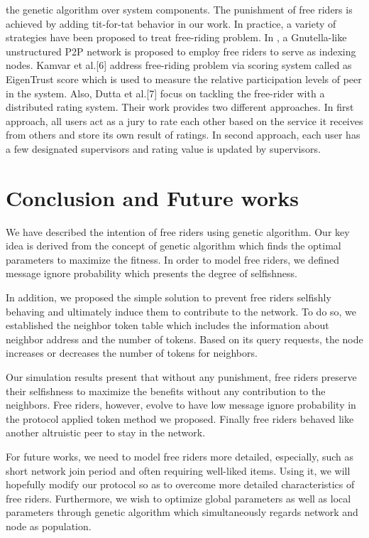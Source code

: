 \documentclass[12pt,journal,draftcls,letterpaper,onecolumn]{IEEEtran}
\begin{document}
the genetic algorithm over system components. The punishment of free riders is achieved by
adding tit-for-tat behavior in our work.
In practice, a variety of strategies have been proposed to treat free-riding problem. In \cite{EUROPAR07}, a
Gnutella-like unstructured P2P network is proposed to employ free riders to serve as indexing
nodes. Kamvar et al.[6] address free-riding problem via scoring system called as EigenTrust
score which is used to measure the relative participation levels of peer in the system. Also,
Dutta et al.[7] focus on tackling the free-rider with a distributed rating system. Their work
provides two different approaches. In first approach, all users act as a jury to rate each other
based on the service it receives from others and store its own result of ratings. In second
approach, each user has a few designated supervisors and rating value is updated by
supervisors.


\section{Conclusion and Future works}\label{sec:concl}

We have described the intention of free riders using genetic algorithm. Our key idea is
derived from the concept of genetic algorithm which finds the optimal parameters to
maximize the fitness. In order to model free riders, we defined message ignore probability
which presents the degree of selfishness.

In addition, we proposed the simple solution to prevent free riders selfishly behaving and
ultimately induce them to contribute to the network. To do so, we established the neighbor
token table which includes the information about neighbor address and the number of tokens.
Based on its query requests, the node increases or decreases the number of tokens for
neighbors.

Our simulation results present that without any punishment, free riders preserve their
selfishness to maximize the benefits without any contribution to the neighbors. Free riders,
however, evolve to have low message ignore probability in the protocol applied token method
we proposed. Finally free riders behaved like another altruistic peer to stay in the network.

For future works, we need to model free riders more detailed, especially, such as short
network join period and often requiring well-liked items. Using it, we will hopefully modify
our protocol so as to overcome more detailed characteristics of free riders. Furthermore, we
wish to optimize global parameters as well as local parameters through genetic algorithm
which simultaneously regards network and node as population.



\end{document}
